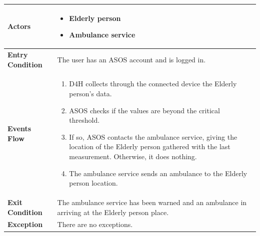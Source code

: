             \begin{table}[H]
            	\centering
                
                \begin{tabular}{|p{3cm}|p{8.2cm}|}
                    \hline
                    \textbf{Actors} & \begin{itemize}
                        \item Elderly person
                        \item Ambulance service
                    \end{itemize} \\
                     \hline
                    \textbf{Entry Condition} & The user has an ASOS account and is logged in. \\
                     \hline
                    \textbf{Events Flow} & \begin{enumerate}
                                               \item D4H collects through the connected device the Elderly person's data.
                                               \item ASOS checks if the values are beyond the critical threshold.
                                               \item If so, ASOS contacts the ambulance service, giving the location of the Elderly person gathered with the last measurement. Otherwise, it does nothing.
                                               \item The ambulance service sends an ambulance to the Elderly person location.
                                           \end{enumerate} \\
                     \hline
                    \textbf{Exit Condition} & The ambulance service has been warned and an ambulance in arriving at the Elderly person place. \\
                     \hline
                    \textbf{Exception} & There are no exceptions. \\
                     \hline
                \end{tabular}  
            \end{table}                 
            
